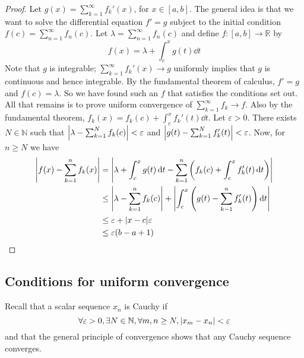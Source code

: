 \begin{proof}
	Let \( g(x) = \sum_{k=1}^\infty f_k'(x) \), for \( x \in [a,b] \).
	The general idea is that we want to solve the differential equation \( f' = g \) subject to the initial condition \( f(c) = \sum_{n=1}^\infty f_n(c) \).
	Let \( \lambda = \sum_{n=1}^\infty f_n(c) \) and define \( f \colon [a,b] \to \mathbb R \) by
	\[
		f(x) = \lambda + \int_c^x g(t) \dd{t}
	\]
	Note that \( g \) is integrable; \( \sum_{k=1}^\infty f_k'(x) \to g \) uniformly implies that \( g \) is continuous and hence integrable.
	By the fundamental theorem of calculus, \( f' = g \) and \( f(c) = \lambda \).
	So we have found such an \( f \) that satisfies the conditions set out.
	All that remains is to prove uniform convergence of \( \sum_{k=1}^\infty f_k \to f \).
	Also by the fundamental theorem, \( f_k(x) = f_k(c) + \int_c^x f_k'(t) \dd{t} \).
	Let \( \varepsilon > 0 \).
	There exists \( N \in \mathbb N \) such that \( \abs{\lambda - \sum_{k=1}^N f_k(c)} < \varepsilon \) and \( \abs{g(t) - \sum_{k=1}^N f_k'(t)} < \varepsilon \).
	Now, for \( n \geq N \) we have
	\begin{align*}
		\abs{f(x) - \sum_{k=1}^n f_k(x)} & = \abs{\lambda + \int_c^x g(t) \dd{t} - \sum_{k=1}^n \qty(f_k(c) + \int_c^x f_k'(t) \dd{t})}       \\
		                                 & \leq \abs{\lambda - \sum_{k=1}^n f_k(c)} + \abs{\int_c^x \qty(g(t) - \sum_{k-1}^n f_k'(t)) \dd{t}} \\
		                                 & \leq \varepsilon + \abs{x-c} \varepsilon                                                           \\
		                                 & \leq \varepsilon (b-a + 1)
	\end{align*}
\end{proof}

\subsection{Conditions for uniform convergence}
Recall that a scalar sequence \( x_n \) is Cauchy if
\[
	\forall \varepsilon > 0, \exists N \in \mathbb N, \forall m,n \geq N, \abs{x_m - x_n} < \varepsilon
\]
and that the general principle of convergence shows that any Cauchy sequence converges.

